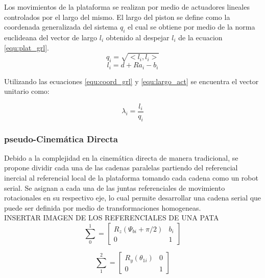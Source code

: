 Los movimientos de la plataforma se realizan por medio de actuadores lineales controlados 
por el largo del mismo. El largo del piston se define como la coordenada generalizada del 
sistema $q_i$ el cual se obtiene por medio de la norma euclideana del vector de largo 
$l_i$ obtenido al despejar $l_i$ de la ecuacion \ref{equ:plat_grl}.
\begin{equation} \label{equ:coord_grl}
q_i = \sqrt{<l_i,l_i>}
\end{equation}
\begin{equation} \label{equ:largo_act}
l_i = d + Ra_i - b_i
\end{equation}

Utilizando las ecuaciones \ref{equ:coord_grl} y \ref{equ:largo_act} se encuentra el vector unitario como:

\begin{equation} \label{equ:vec_U}
\lambda_i = \frac{l_i}{q_i}
\end{equation}

\subsubsection{pseudo-Cinemática Directa}
Debido a la complejidad en la cinemática directa de manera tradicional, se propone 
dividir cada una de las cadenas paralelas partiendo del referencial inercial al referencial 
local de la plataforma tomando cada cadena como un robot serial. Se asignan a cada una de 
las juntas referenciales de movimiento rotacionales en su respectivo eje, lo cual permite 
desarrollar una cadena serial que puede ser definida por medio de transformaciones 
homogeneas.\\

INSERTAR IMAGEN DE LOS REFERENCIALES DE UNA PATA\\

\begin{equation}
\sum_0^1 = \begin{bmatrix}
R_z(\Psi_{bi} + \pi/2) & b_i\\
0 & 1
\end{bmatrix}
\end{equation}

\begin{equation}
\sum_1^2 = \begin{bmatrix}
R_y(\theta_{1i}) & 0\\
0 & 1
\end{bmatrix}
\end{equation}


